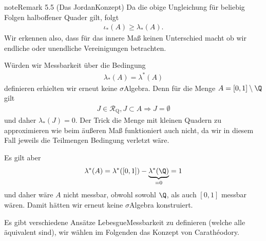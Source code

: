 \documentclass[letterpaper,10pt,german]{jupyterBook}
\begin{document}
\begin{sphinxadmonition}{note}{Remark 5.5 (Das Jordan\sphinxhyphen{}Konzept)}
\sphinxAtStartPar
Da die obige Ungleichung für beliebig Folgen halboffener Quader gilt, folgt
\begin{equation*}
\begin{split}\iota_\ast(A) \geq \lambda_\ast(A).\end{split}
\end{equation*}
\sphinxAtStartPar
Wir erkennen also, dass für das innere Maß keinen Unterschied macht ob wir endliche oder unendliche Vereinigungen betrachten.

\sphinxAtStartPar
Würden wir Messbarkeit über die Bedingung
\begin{equation*}
\begin{split}\lambda_\ast(A)=\lambda^\ast(A)\end{split}
\end{equation*}
\sphinxAtStartPar
definieren erhielten wir erneut keine \(\sigma\)\sphinxhyphen{}Algebra. Denn für die Menge \(A=[0,1]\setminus\Q\) gilt
\begin{equation*}
\begin{split}J\in\mathcal{R}_{\text{Q}}, J\subset A\Rightarrow J=\emptyset\end{split}
\end{equation*}
\sphinxAtStartPar
und daher \(\lambda_\ast(J) = 0\). Der Trick die Menge mit kleinen Quadern zu approximieren wie beim äußeren Maß funktioniert auch nicht, da wir in diesem Fall jeweils die Teilmengen Bedingung verletzt wäre.

\sphinxAtStartPar
Es gilt aber
\begin{equation*}
\begin{split}\lambda^\ast(A) = \lambda^\ast([0,1]) - \underbrace{\lambda^\ast(\Q)}_{=0} = 1\end{split}
\end{equation*}
\sphinxAtStartPar
und daher wäre \(A\) nicht messbar, obwohl sowohl \(\Q\), als auch \([0,1]\) messbar wären. Damit hätten wir erneut keine \(\sigma\)\sphinxhyphen{}Algebra konstruiert.
\end{sphinxadmonition}

\sphinxAtStartPar
Es gibt verschiedene Ansätze Lebesgue\sphinxhyphen{}Messbarkeit zu definieren (welche alle äquivalent sind), wir wählen im Folgenden das Konzept von
Carathéodory.
\end{document}
